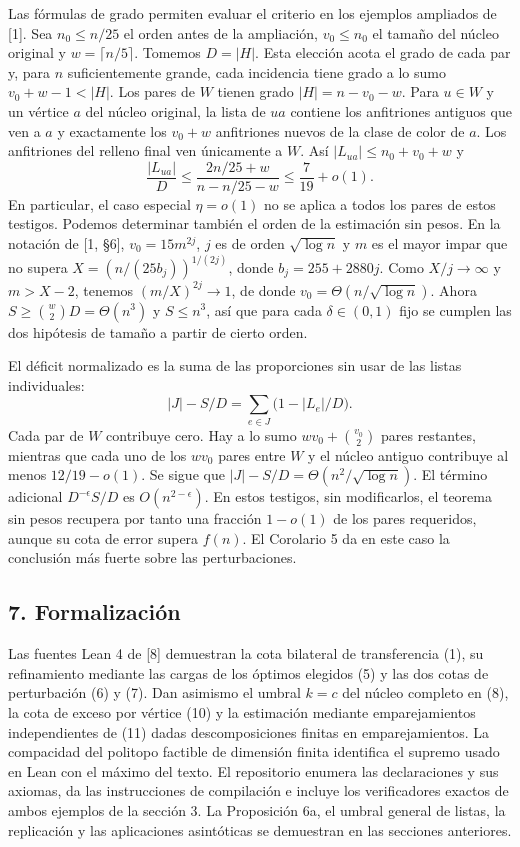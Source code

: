 \documentclass[spanish,11pt,a4paper]{article}
\begin{document}
Las fórmulas de grado permiten evaluar el criterio en los ejemplos ampliados de {[}1{]}. Sea \(n_0\le n/25\) el orden antes de la ampliación, \(v_0\le n_0\) el tamaño del núcleo original y \(w=\lceil n/5\rceil\). Tomemos \(D=|H|\). Esta elección acota el grado de cada par y, para \(n\) suficientemente grande, cada incidencia tiene grado a lo sumo \(v_0+w-1<|H|\). Los pares de \(W\) tienen grado \(|H|=n-v_0-w\). Para \(u\in W\) y un vértice \(a\) del núcleo original, la lista de \(ua\) contiene los anfitriones antiguos que ven a \(a\) y exactamente los \(v_0+w\) anfitriones nuevos de la clase de color de \(a\). Los anfitriones del relleno final ven únicamente a \(W\). Así \(|L_{ua}|\le n_0+v_0+w\) y \[
\frac{|L_{ua}|}{D}\le\frac{2n/25+w}{n-n/25-w}
      \le\frac7{19}+o(1).
\] En particular, el caso especial \(\eta=o(1)\) no se aplica a todos los pares de estos testigos. Podemos determinar también el orden de la estimación sin pesos. En la notación de {[}1, §6{]}, \(v_0=15m^{2j}\), \(j\) es de orden \(\sqrt{\log n}\) y \(m\) es el mayor impar que no supera \(X=(n/(25b_j))^{1/(2j)}\), donde \(b_j=255+2880j\). Como \(X/j\to\infty\) y \(m>X-2\), tenemos \((m/X)^{2j}\to1\), de donde \(v_0=\Theta(n/\sqrt{\log n})\). Ahora \(S\ge\binom w2D=\Theta(n^3)\) y \(S\le n^3\), así que para cada \(\delta\in(0,1)\) fijo se cumplen las dos hipótesis de tamaño a partir de cierto orden.

El déficit normalizado es la suma de las proporciones sin usar de las listas individuales: \[
|J|-S/D=\sum_{e\in J}\bigl(1-|L_e|/D\bigr).
\] Cada par de \(W\) contribuye cero. Hay a lo sumo \(wv_0+\binom{v_0}{2}\) pares restantes, mientras que cada uno de los \(wv_0\) pares entre \(W\) y el núcleo antiguo contribuye al menos \(12/19-o(1)\). Se sigue que \(|J|-S/D=\Theta(n^2/\sqrt{\log n})\). El término adicional \(D^{-\epsilon}S/D\) es \(O(n^{2-\epsilon})\). En estos testigos, sin modificarlos, el teorema sin pesos recupera por tanto una fracción \(1-o(1)\) de los pares requeridos, aunque su cota de error supera \(f(n)\). El Corolario 5 da en este caso la conclusión más fuerte sobre las perturbaciones.

\subsection{7. Formalización}\label{formalizaciuxf3n}

Las fuentes Lean 4 de {[}8{]} demuestran la cota bilateral de transferencia (1), su refinamiento mediante las cargas de los óptimos elegidos (5) y las dos cotas de perturbación (6) y (7). Dan asimismo el umbral \(k=c\) del núcleo completo en (8), la cota de exceso por vértice (10) y la estimación mediante emparejamientos independientes de (11) dadas descomposiciones finitas en emparejamientos. La compacidad del politopo factible de dimensión finita identifica el supremo usado en Lean con el máximo del texto. El repositorio enumera las declaraciones y sus axiomas, da las instrucciones de compilación e incluye los verificadores exactos de ambos ejemplos de la sección 3. La Proposición 6a, el umbral general de listas, la replicación y las aplicaciones asintóticas se demuestran en las secciones anteriores.
\end{document}
